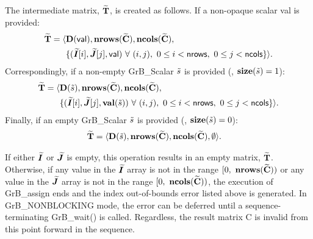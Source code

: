 The intermediate matrix, ${\bf \widetilde{T}}$, is created as follows. If a non-opaque scalar {\sf val} is provided:
\[
\begin{aligned}
{\bf \widetilde{T}} = \langle & \bold{D}({\sf val}),
                           \bold{nrows}({\bf \widetilde{C}}), 
                           \bold{ncols}({\bf \widetilde{C}}), \\
 & \{ (\bm{\widetilde{I}}[i],\bm{\widetilde{J}}[j], {\sf val})
\ \forall \ (i,j), \ 0 \leq i < {\sf nrows}, \ 0 \leq j < {\sf ncols} \} \rangle. 
\end{aligned}
\]
Correspondingly, if a non-empty {\sf GrB\_Scalar} ${\tilde{s}}$ is provided (\ie, $\mathbf{size}({\tilde{s}}) = 1$):
\[
\begin{aligned}
{\bf \widetilde{T}} = \langle & \bold{D}({\tilde{s}}),
                           \bold{nrows}({\bf \widetilde{C}}), 
                           \bold{ncols}({\bf \widetilde{C}}), \\
    & \{ (\bm{\widetilde{I}}[i],\bm{\widetilde{J}}[j], \mathbf{val}({\tilde{s}}))
\ \forall \ (i,j), \ 0 \leq i < {\sf nrows}, \ 0 \leq j < {\sf ncols} \} \rangle. 
\end{aligned}
\]
Finally, if an empty {\sf GrB\_Scalar} ${\tilde{s}}$ is provided (\ie, $\mathbf{size}({\tilde{s}}) = 0$):
\[
\begin{aligned}
{\bf \widetilde{T}} = \langle & \bold{D}({\tilde{s}}),
                           \bold{nrows}({\bf \widetilde{C}}), 
                           \bold{ncols}({\bf \widetilde{C}}), \emptyset \rangle. 
\end{aligned}
\]

If either $\bm{\widetilde{I}}$ or $\bm{\widetilde{J}}$ is empty, this 
operation results in an empty matrix, ${\bf \widetilde{T}}$.  Otherwise, if 
any value in the $\bm{\widetilde{I}}$ array is not in
the range $[0,\ \bold{nrows}(\matrix{\widetilde{C}}) )$ or any value in the 
$\bm{\widetilde{J}}$ array is not in the range 
$[0,\ \bold{ncols}(\matrix{\widetilde{C}}))$, the execution of {\sf GrB\_assign} 
ends and the index out-of-bounds error listed above is generated.  In 
{\sf GrB\_NONBLOCKING} mode, the error can be deferred until a 
sequence-terminating {\sf GrB\_wait()} is called.  Regardless, the result 
matrix {\sf C} is invalid from this point forward in the sequence.


